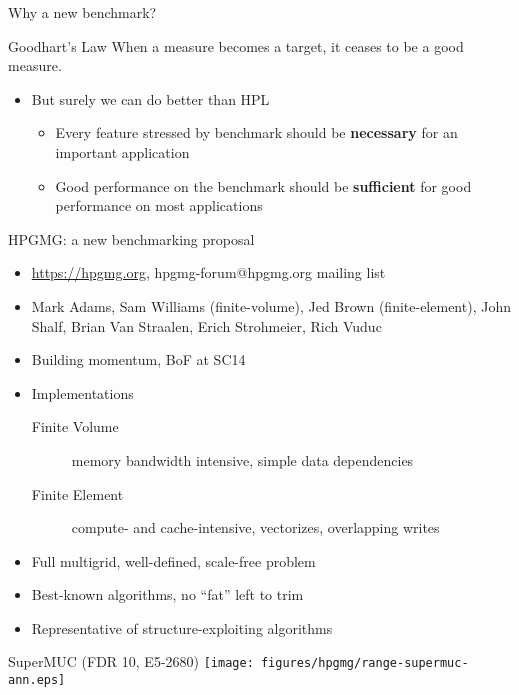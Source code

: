 \documentclass{beamer}
\begin{document}
\begin{frame}{Why a new benchmark?}
  \begin{block}{Goodhart's Law}
    When a measure becomes a target, it ceases to be a good measure.
  \end{block}
  \begin{itemize}
  \item But surely we can do better than HPL
    \begin{itemize}
    \item Every feature stressed by benchmark should be {\bf necessary} for an important application
    \item Good performance on the benchmark should be {\bf sufficient} for good performance on most applications
    \end{itemize}
  \end{itemize}
\end{frame}

\begin{frame}{HPGMG: a new benchmarking proposal}
  \begin{itemize}
  \item \url{https://hpgmg.org}, hpgmg-forum@hpgmg.org mailing list
  \item Mark Adams, Sam Williams (finite-volume), Jed Brown (finite-element), John Shalf, Brian Van Straalen, Erich Strohmeier, Rich Vuduc
  \item Building momentum, BoF at SC14
  \item Implementations
    \begin{description}
    \item[Finite Volume] memory bandwidth intensive, simple data dependencies
    \item[Finite Element] compute- and cache-intensive, vectorizes, overlapping writes
    \end{description}
  \item Full multigrid, well-defined, scale-free problem
  \item Best-known algorithms, no ``fat'' left to trim
  \item Representative of structure-exploiting algorithms
  \end{itemize}
\end{frame}

\begin{frame}{SuperMUC (FDR 10, E5-2680)}
  \texttt{[image: figures/hpgmg/range-supermuc-ann.eps]}
\end{frame}
\end{document}
